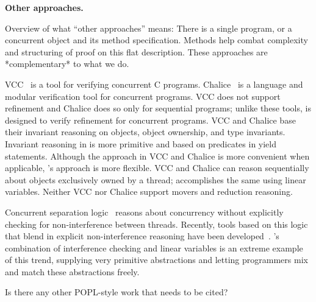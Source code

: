 {\bf Other approaches.}

Overview of what ``other approaches'' means: There is a single
program, or a concurrent object and its method specification. Methods
help combat complexity and structuring of proof on this flat
description. These approaches are *complementary* to what we do.

VCC~\cite{VCC} is a tool for verifying concurrent C programs.  
Chalice~\cite{LM09} is a language and modular verification tool for concurrent programs. 
VCC does not support refinement and Chalice does so only for sequential programs;
unlike these tools, \civl is designed to verify refinement for concurrent programs.  
VCC and Chalice base their invariant reasoning on objects, object ownership, and type invariants. 
Invariant reasoning in \civl is more primitive and based on predicates in yield statements. 
Although the approach in VCC and Chalice is more convenient when applicable, \civl's approach is more flexible. 
VCC and Chalice can reason sequentially about objects exclusively owned by a thread;
\civl accomplishes the same using linear variables.
Neither VCC nor Chalice support movers and reduction reasoning.

Concurrent separation logic~\cite{OHearn07} reasons about concurrency without 
explicitly checking for non-interference between threads. 
Recently, tools based on this logic that blend in explicit non-interference reasoning have been developed~\cite{SAGL,RGSep}. 
\civl's combination of interference checking and linear variables is an extreme example of this trend,
supplying very primitive abstractions and letting programmers mix and
match these abstractions freely.

Is there any other POPL-style work that needs to be cited?


